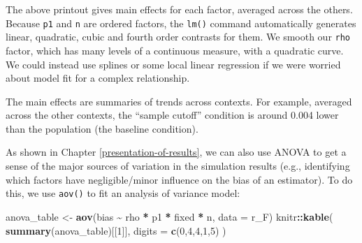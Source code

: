 \documentclass[
]{book}
\newenvironment{Shaded}{\begin{snugshade}}{\end{snugshade}}
\newcommand{\AttributeTok}[1]{\textcolor[rgb]{0.13,0.29,0.53}{#1}}
\newcommand{\DecValTok}[1]{\textcolor[rgb]{0.00,0.00,0.81}{#1}}
\newcommand{\FunctionTok}[1]{\textcolor[rgb]{0.13,0.29,0.53}{\textbf{#1}}}
\newcommand{\NormalTok}[1]{#1}
\newcommand{\OtherTok}[1]{\textcolor[rgb]{0.56,0.35,0.01}{#1}}
\newcommand{\SpecialCharTok}[1]{\textcolor[rgb]{0.81,0.36,0.00}{\textbf{#1}}}
\begin{document}
The above printout gives main effects for each factor, averaged across the others.
Because \texttt{p1} and \texttt{n} are ordered factors, the \texttt{lm()} command automatically generates linear, quadratic, cubic and fourth order contrasts for them.
We smooth our \texttt{rho} factor, which has many levels of a continuous measure, with a quadratic curve.
We could instead use splines or some local linear regression if we were worried about model fit for a complex relationship.

The main effects are summaries of trends across contexts.
For example, averaged across the other contexts, the ``sample cutoff'' condition is around 0.004 lower than the population (the baseline condition).

As shown in Chapter \ref{presentation-of-results}, we can also use ANOVA to get a sense of the major sources of variation in the simulation results (e.g., identifying which factors have negligible/minor influence on the bias of an estimator).
To do this, we use \texttt{aov()} to fit an analysis of variance model:

\begin{Shaded}
\begin{Highlighting}[]
\NormalTok{anova\_table }\OtherTok{\textless{}{-}} \FunctionTok{aov}\NormalTok{(bias }\SpecialCharTok{\textasciitilde{}}\NormalTok{ rho }\SpecialCharTok{*}\NormalTok{ p1 }\SpecialCharTok{*}\NormalTok{ fixed }\SpecialCharTok{*}\NormalTok{ n, }\AttributeTok{data =}\NormalTok{ r\_F)}
\NormalTok{knitr}\SpecialCharTok{::}\FunctionTok{kable}\NormalTok{( }\FunctionTok{summary}\NormalTok{(anova\_table)[[}\DecValTok{1}\NormalTok{]],}
              \AttributeTok{digits =} \FunctionTok{c}\NormalTok{(}\DecValTok{0}\NormalTok{,}\DecValTok{4}\NormalTok{,}\DecValTok{4}\NormalTok{,}\DecValTok{1}\NormalTok{,}\DecValTok{5}\NormalTok{) )}
\end{Highlighting}
\end{Shaded}
\end{document}
